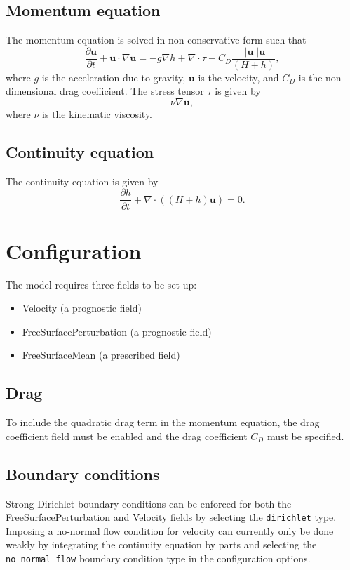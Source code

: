 \documentclass[a4paper,11pt]{report}
\begin{document}
\subsection{Momentum equation}
The momentum equation is solved in non-conservative form such that
\begin{equation}
   \frac{\partial \mathbf{u}}{\partial t} + \mathbf{u}\cdot\nabla\mathbf{u} = -g\nabla h + \nabla\cdot\tau - C_D\frac{||\mathbf{u}||\mathbf{u}}{(H + h)},
\end{equation}
where $g$ is the acceleration due to gravity, $\mathbf{u}$ is the velocity, and $C_D$ is the non-dimensional drag coefficient. The stress tensor $\tau$ is given by 
\begin{equation}
   \nu\nabla\mathbf{u},
\end{equation}
where $\nu$ is the kinematic viscosity.

\subsection{Continuity equation}
The continuity equation is given by
\begin{equation}
   \frac{\partial h}{\partial t} + \nabla\cdot\left(\left(H + h\right)\mathbf{u}\right) = 0.
\end{equation}

\section{Configuration}
The model requires three fields to be set up:
\begin{itemize}
   \item Velocity (a prognostic field)
   \item FreeSurfacePerturbation (a prognostic field)
   \item FreeSurfaceMean (a prescribed field)
\end{itemize}

\subsection{Drag}
To include the quadratic drag term in the momentum equation, the drag coefficient field must be enabled and the drag coefficient $C_D$ must be specified.

\subsection{Boundary conditions}
Strong Dirichlet boundary conditions can be enforced for both the FreeSurfacePerturbation and Velocity fields by selecting the \texttt{dirichlet} type. Imposing a no-normal flow condition for velocity can currently only be done weakly by integrating the continuity equation by parts and selecting the \texttt{no\_normal\_flow} boundary condition type in the configuration options.
\end{document}
